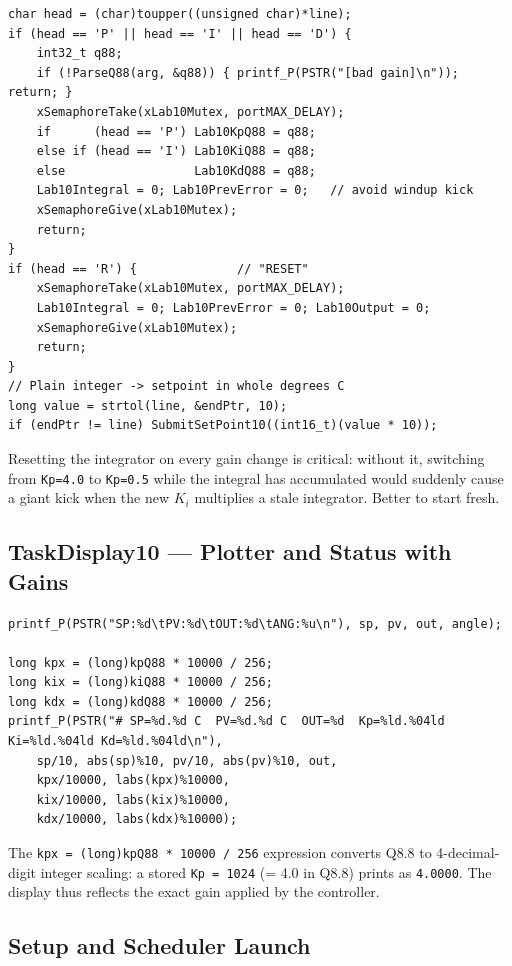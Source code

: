 \documentclass[12pt]{article}
\begin{document}
\begin{lstlisting}[caption={ProcessSerialLine --- P/I/D/RESET dispatch}]
char head = (char)toupper((unsigned char)*line);
if (head == 'P' || head == 'I' || head == 'D') {
    int32_t q88;
    if (!ParseQ88(arg, &q88)) { printf_P(PSTR("[bad gain]\n")); return; }
    xSemaphoreTake(xLab10Mutex, portMAX_DELAY);
    if      (head == 'P') Lab10KpQ88 = q88;
    else if (head == 'I') Lab10KiQ88 = q88;
    else                  Lab10KdQ88 = q88;
    Lab10Integral = 0; Lab10PrevError = 0;   // avoid windup kick
    xSemaphoreGive(xLab10Mutex);
    return;
}
if (head == 'R') {              // "RESET"
    xSemaphoreTake(xLab10Mutex, portMAX_DELAY);
    Lab10Integral = 0; Lab10PrevError = 0; Lab10Output = 0;
    xSemaphoreGive(xLab10Mutex);
    return;
}
// Plain integer -> setpoint in whole degrees C
long value = strtol(line, &endPtr, 10);
if (endPtr != line) SubmitSetPoint10((int16_t)(value * 10));
\end{lstlisting}

Resetting the integrator on every gain change is critical: without it, switching from \texttt{Kp=4.0} to \texttt{Kp=0.5} while the integral has accumulated would suddenly cause a giant kick when the new $K_i$ multiplies a stale integrator. Better to start fresh.

\subsection{TaskDisplay10 --- Plotter and Status with Gains}

\begin{lstlisting}[caption={TaskDisplay10 --- 500\,ms output with Q8.8 gain decode}]
printf_P(PSTR("SP:%d\tPV:%d\tOUT:%d\tANG:%u\n"), sp, pv, out, angle);

long kpx = (long)kpQ88 * 10000 / 256;
long kix = (long)kiQ88 * 10000 / 256;
long kdx = (long)kdQ88 * 10000 / 256;
printf_P(PSTR("# SP=%d.%d C  PV=%d.%d C  OUT=%d  Kp=%ld.%04ld Ki=%ld.%04ld Kd=%ld.%04ld\n"),
    sp/10, abs(sp)%10, pv/10, abs(pv)%10, out,
    kpx/10000, labs(kpx)%10000,
    kix/10000, labs(kix)%10000,
    kdx/10000, labs(kdx)%10000);
\end{lstlisting}

The \texttt{kpx = (long)kpQ88 * 10000 / 256} expression converts Q8.8 to 4-decimal-digit integer scaling: a stored \texttt{Kp = 1024} (= 4.0 in Q8.8) prints as \texttt{4.0000}. The display thus reflects the exact gain applied by the controller.

\subsection{Setup and Scheduler Launch}
\end{document}
